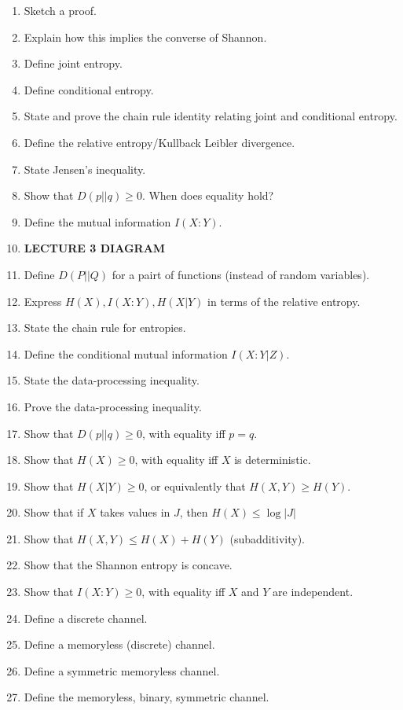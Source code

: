\documentclass{article}
\begin{document}
\begin{enumerate}
    \item Sketch a proof.
    \item Explain how this implies the converse of Shannon.
    \item Define joint entropy.
    \item Define conditional entropy.
    \item State and prove the chain rule identity relating joint and conditional entropy.
    \item Define the relative entropy/Kullback Leibler divergence.
    \item State Jensen's inequality.
    \item Show that $D(p||q)\ge 0$. When does equality hold?
    \item Define the mutual information $I(X:Y)$.
    \item \textbf{LECTURE 3 DIAGRAM}
    \item Define $D(P||Q)$ for a pairt of functions (instead of random variables).
    \item Express $H(X), I(X:Y), H(X|Y)$ in terms of the relative entropy.
    \item State the chain rule for entropies.
    \item Define the conditional mutual information $I(X:Y|Z)$.
    \item State the data-processing inequality.
    \item Prove the data-processing inequality.
    \item Show that $D(p||q) \ge 0 $, with equality iff $p = q$.
    \item Show that $H(X) \ge 0$, with equality iff $X$ is deterministic.
    \item Show that $H(X|Y) \ge 0$, or equivalently that $H(X,Y)\ge H(Y)$.
    \item Show that if $X$ takes values in $J$, then $H(X) \le \log |J|$
    \item Show that $H(X,Y) \le H(X) + H(Y)$ (subadditivity).
    \item Show that the Shannon entropy is concave.
    \item Show that $I(X:Y) \ge 0$, with equality iff $X$ and $Y$ are independent.
    \item Define a discrete channel.
    \item Define a memoryless (discrete) channel.
    \item Define a symmetric memoryless channel.
    \item Define the memoryless, binary, symmetric channel.

\end{enumerate}
\end{document}
